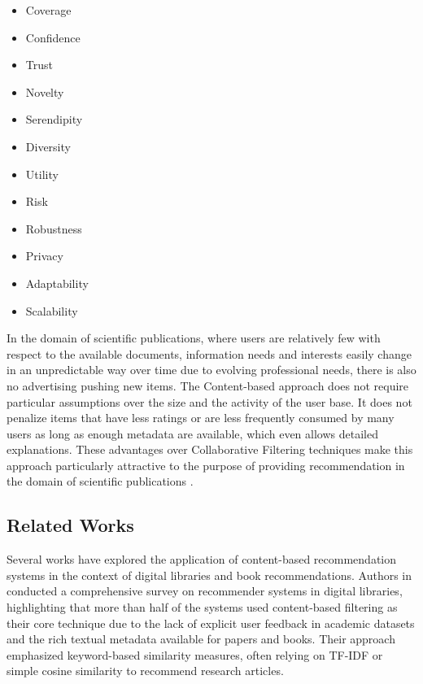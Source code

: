 \documentclass[\myFontSize,a4paper,oneside,hidelinks]{article}
\begin{document}
\begin{multicols}{3}
\begin{itemize}
\item Coverage
\item Confidence
\item Trust
\item Novelty
\item Serendipity
\item Diversity
\item Utility
\item Risk
\item Robustness
\item Privacy
\item Adaptability
\item Scalability
\end{itemize}
\end{multicols}
%
%
%
In the domain of scientific publications, where users are relatively few with respect to the available documents, information needs and interests easily change in an unpredictable way over time due to evolving professional needs, there is also no advertising pushing new items.
The Content-based approach does not require particular assumptions over the size and the activity of the user base. It does not penalize items that have less ratings or are less frequently consumed by many users as long as enough metadata are available, which even allows detailed explanations. These advantages over Collaborative Filtering techniques make this approach particularly attractive to the purpose of providing recommendation in the domain of scientific publications \cite{De_Nart201484}. 
%
%
\subsection{Related Works}
%
Several works have explored the application of content-based recommendation systems in the context of digital libraries and book recommendations. Authors in \cite{Beel2016305} conducted a comprehensive survey on recommender systems in digital libraries, highlighting that more than half of the systems used content-based filtering as their core technique due to the lack of explicit user feedback in academic datasets and the rich textual metadata available for papers and books. Their approach emphasized keyword-based similarity measures, often relying on TF-IDF or simple cosine similarity to recommend research articles.
\end{document}
